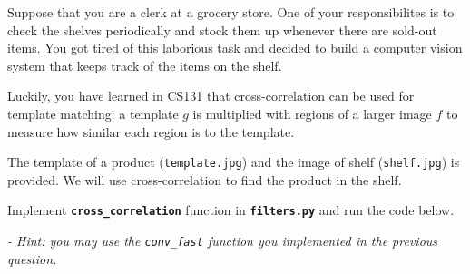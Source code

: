 \documentclass[11pt]{article}
\begin{document}
Suppose that you are a clerk at a grocery store. One of your
responsibilites is to check the shelves periodically and stock them up
whenever there are sold-out items. You got tired of this laborious task
and decided to build a computer vision system that keeps track of the
items on the shelf.

Luckily, you have learned in CS131 that cross-correlation can be used
for template matching: a template \(g\) is multiplied with regions of a
larger image \(f\) to measure how similar each region is to the
template.

The template of a product (\texttt{template.jpg}) and the image of shelf
(\texttt{shelf.jpg}) is provided. We will use cross-correlation to find
the product in the shelf.

Implement \textbf{\texttt{cross\_correlation}} function in
\textbf{\texttt{filters.py}} and run the code below.

\emph{- Hint: you may use the \texttt{conv\_fast} function you
implemented in the previous question.}
\end{document}
